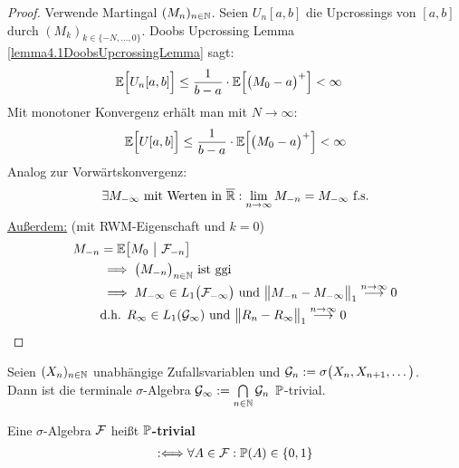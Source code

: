 \begin{proof}
	Verwende Martingal $(M_n)_{n\in\N}$. Seien $U_n [ a,b]$ die Upcrossings von $[ a,b]$ durch $(M_k)_{k\in\lbrace-N,\ldots,0\rbrace}$.
	Doobs Upcrossing Lemma \ref{lemma4.1DoobsUpcrossingLemma} sagt:
	\begin{align*}
		\E\Big[U_n[ a,b]\Big]
		&\leq
		\frac{1}{b-a}\cdot\E\Big[\big(M_0-a\big)^+\Big]<\infty
	\end{align*}
	Mit monotoner Konvergenz erhält man mit $N\to\infty$:
	\begin{align*}
		\E\Big[U[a,b]\Big]\leq\frac{1}{b-a}\cdot\E\Big[\big(M_0-a\big)^+\Big]<\infty
	\end{align*}
	Analog zur Vorwärtskonvergenz:
	\begin{align*}
		\exists M_{-\infty}\text{ mit Werten in }\overline{\R}:\limn M_{-n}=M_{-\infty}\text{ f.s.}
	\end{align*}
	\ul{Außerdem:} (mit RWM-Eigenschaft und $k=0$)
	\begin{align*}
		M_{-n}
		&=\E\big[M_0~\big|~\F_{-n}\big]\\
		&\implies \big(M_{-n}\big)_{n\in\N}\text{ ist ggi}\\
		&\implies M_{-\infty}\in L_1\big(\F_{-\infty}\big)\text{ und }\big\Vert M_{-n}-M_{-\infty}\big\Vert_1\stackrel{n\to\infty}{\longrightarrow}0\\
		&\text{d.h. }R_\infty\in L_1(\G_\infty)\text{ und }\big\Vert R_n-R_\infty\big\Vert_1\stackrel{n\to\infty}{\longrightarrow}0
	\end{align*}
\end{proof}

\begin{theorem}\label{theorem5.6Kolmogorovs01Gesetz}\enter
	Seien $(X_n)_{n\in\N}$ unabhängige Zufallsvariablen und $\G_n:=\sigma\big(X_n,X_{n+1},\ldots\big)$.\\
	Dann ist die terminale $\sigma$-Algebra
	$\G_\infty:=\bigcap\limits_{n\in\N}\G_n$ $\P$-trivial.
\end{theorem}

\begin{bemerkung}
	Eine $\sigma$-Algebra $\F$ heißt \textbf{$\P$-trivial}
	\begin{align*}
		:\Longleftrightarrow\forall A\in\F:\P(A)\in\lbrace0,1\rbrace
	\end{align*}
\end{bemerkung}

